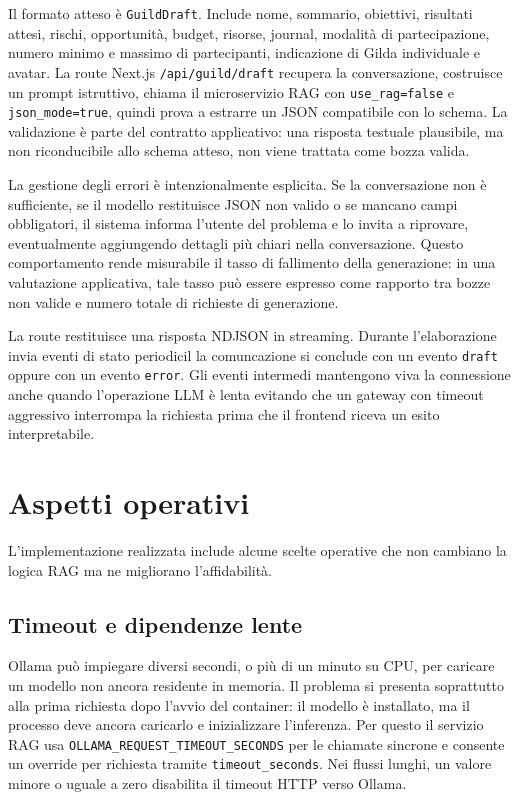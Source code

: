 Il formato atteso è \texttt{GuildDraft}. Include nome, sommario, obiettivi,
risultati attesi, rischi, opportunità, budget, risorse, journal, modalità di
partecipazione, numero minimo e massimo di partecipanti, indicazione di Gilda
individuale e avatar. La route Next.js \texttt{/api/guild/draft} recupera la
conversazione, costruisce un prompt istruttivo, chiama il microservizio RAG con
\texttt{use\_rag=false} e \texttt{json\_mode=true}, quindi prova a estrarre un
JSON compatibile con lo schema. La validazione è parte del contratto
applicativo: una risposta testuale plausibile, ma non riconducibile allo schema
atteso, non viene trattata come bozza valida.

La gestione degli errori è intenzionalmente esplicita. Se la conversazione non è
sufficiente, se il modello restituisce JSON non valido o se mancano campi
obbligatori, il sistema informa l'utente del problema e lo invita a riprovare,
eventualmente aggiungendo dettagli più chiari nella conversazione. Questo
comportamento rende misurabile il tasso di fallimento della generazione: in una
valutazione applicativa, tale tasso può essere espresso come rapporto tra bozze
non valide e numero totale di richieste di generazione.

La route restituisce una risposta NDJSON in streaming. Durante l'elaborazione
invia eventi di stato periodicil la comuncazione si conclude con un evento \texttt{draft} oppure
con un evento \texttt{error}. Gli eventi intermedi mantengono viva la
connessione anche quando l'operazione LLM è lenta evitando che un gateway con
timeout aggressivo interrompa la richiesta prima che il frontend riceva un esito
interpretabile.


\section{Aspetti operativi}
\label{sec:implementation_operations}

L'implementazione realizzata include alcune scelte operative che non cambiano la logica RAG
ma ne migliorano l'affidabilità.

\subsection{Timeout e dipendenze lente}
\label{subsec:implementation_timeouts}

Ollama può impiegare diversi secondi, o più di un minuto su CPU, per caricare un
modello non ancora residente in memoria. Il problema si presenta soprattutto
alla prima richiesta dopo l'avvio del container: il modello è installato, ma il
processo deve ancora caricarlo e inizializzare l'inferenza. Per questo il
servizio RAG usa \texttt{OLLAMA\_REQUEST\_TIMEOUT\_SECONDS} per le chiamate
sincrone e consente un override per richiesta tramite \texttt{timeout\_seconds}.
Nei flussi lunghi, un valore minore o uguale a zero disabilita il timeout HTTP
verso Ollama.


